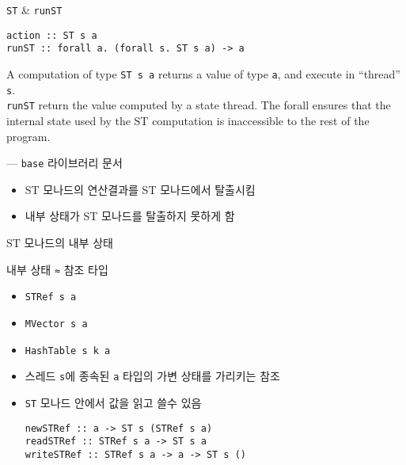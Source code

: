 \documentclass{beamer}
\begin{document}
\begin{frame}[fragile] {\texttt{ST} \& \texttt{runST}}
\begin{verbatim}
action :: ST s a
runST :: forall a. (forall s. ST s a) -> a
\end{verbatim}
  \vfill
  \begin{displayquote}
    A computation of type \texttt{ST s a} returns a value of type \texttt{a}, and execute in ``thread'' \texttt{s}.\\
    \texttt{runST} return the value computed by a state thread. The forall ensures that the internal state used by the ST computation is inaccessible to the rest of the program.
    \par\raggedleft--- \textup{\texttt{base}} 라이브러리 문서
  \end{displayquote}
  \pause
  \begin{itemize}
    \item ST 모나드의 연산결과를 ST 모나드에서 탈출시킴
    \item 내부 상태가 ST 모나드를 탈출하지 못하게 함
  \end{itemize}
\end{frame}

\begin{frame}[fragile] {ST 모나드의 내부 상태}
  \begin{block}{내부 상태 \texttt{≈} 참조 타입}
    \begin{itemize}
      \item \texttt{STRef s a}
      \item \texttt{MVector s a}
      \item \texttt{HashTable s k a}
      \pause
      \item 스레드 \texttt{s}에 종속된 \texttt{a} 타입의 가변 상태를 가리키는 참조
      \item \texttt{ST} 모나드 안에서 값을 읽고 쓸수 있음
\begin{verbatim}
newSTRef :: a -> ST s (STRef s a)
readSTRef :: STRef s a -> ST s a
writeSTRef :: STRef s a -> a -> ST s ()
\end{verbatim}
    \end{itemize}
  \end{block}
\end{frame}
\end{document}
